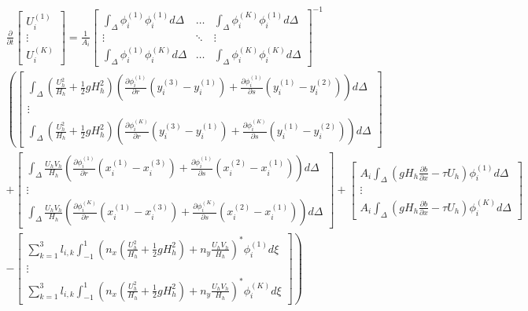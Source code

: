 \documentclass[11pt]{article}
\begin{document}
{\tiny
\begin{multline}
\frac{\partial}{\partial t} \begin{bmatrix} U_i^{(1)} \\[5pt] \vdots \\[5pt] U_i^{(K)}  \end{bmatrix} =\frac{1}{A_i}\begin{bmatrix}\displaystyle\int_{\Delta}\phi_i^{(1)}\phi_i^{(1)}d\Delta & \hdots & \displaystyle\int_{\Delta}\phi_i^{(K)}\phi_i^{(1)}d\Delta \\[5pt] \vdots & \ddots & \vdots \\[5pt]  \displaystyle\int_{\Delta}\phi_i^{(1)}\phi_i^{(K)}d\Delta & \hdots & \displaystyle\int_{\Delta}\phi_i^{(K)}\phi_i^{(K)}d\Delta\end{bmatrix}^{-1}  \\ \left( \begin{bmatrix}\displaystyle\int_{\Delta}\left(\frac{U_h^2}{H_h} + \frac{1}{2}gH_h^2\right)\left(\frac{\partial \phi_i^{(1)}}{\partial r}\left(y_i^{(3)}-y_i^{(1)}\right) + \frac{\partial \phi_i^{(1)}}{\partial s}\left(y_i^{(1)}-y_i^{(2)}\right) \right)d\Delta     \\ \vdots \\ \displaystyle\int_{\Delta}\left(\frac{U_h^2}{H_h} + \frac{1}{2}gH_h^2\right)\left(\frac{\partial \phi_i^{(K)}}{\partial r}\left(y_i^{(3)}-y_i^{(1)}\right) + \frac{\partial \phi_i^{(K)}}{\partial s}\left(y_i^{(1)}-y_i^{(2)}\right) \right) d\Delta \end{bmatrix} \right.\\ + \left. \begin{bmatrix}  \displaystyle\int_{\Delta}\frac{U_hV_h}{H_h}\left(\frac{\partial \phi_i^{(1)}}{\partial r}\left(x_i^{(1)}-x_i^{(3)}\right) + \frac{\partial \phi_i^{(1)}}{\partial s}\left(x_i^{(2)}-x_i^{(1)}\right) \right)d\Delta \\ \vdots \\ \displaystyle\int_{\Delta}\frac{U_hV_h}{H_h}\left(\frac{\partial \phi_i^{(K)}}{\partial r}\left(x_i^{(1)}-x_i^{(3)}\right) + \frac{\partial \phi_i^{(K)}}{\partial s}\left(x_i^{(2)}-x_i^{(1)}\right) \right) d\Delta \end{bmatrix} + \begin{bmatrix}A_i \displaystyle\int_{\Delta}\left( gH_h\frac{\partial b}{\partial x} - \tau U_h \right)\phi_i^{(1)} d\Delta  \\ \vdots \\  A_i\displaystyle\int_{\Delta}\left( gH_h\frac{\partial b}{\partial x} - \tau U_h \right)\phi_i^{(K)} d\Delta  \end{bmatrix} \right. \\ \left. -\begin{bmatrix}\displaystyle\sum_{k=1}^3 l_{i,k}\int_{-1}^1 \left(n_x\left(\frac{U_h^2}{H_h} + \frac{1}{2}gH_h^2\right) + n_y\frac{U_hV_h}{H_h}\right)^*\phi_i^{(1)} d\xi \\ \vdots \\ \displaystyle\sum_{k=1}^3 l_{i,k}\int_{-1}^1 \left(n_x\left(\frac{U_h^2}{H_h} + \frac{1}{2}
gH_h^2\right) + n_y\frac{U_hV_h}{H_h}\right)^*\phi_i^{(K)} d\xi \end{bmatrix} \right) 
\end{multline}}
\end{document}
